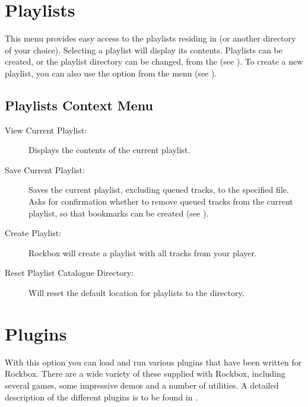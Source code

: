 
\section{\label{ref:playlistoptions}Playlists}
  This menu provides easy access to the playlists residing in  (or another
  directory of your choice). Selecting a playlist will display its contents.
  Playlists can be created, or the playlist directory can be changed, from the
   (see ).
  To create a new playlist, you can also use the  option from the
   menu (see ).

\subsection{\label{ref:playlistcatalogue_contextmenu}Playlists Context Menu}

\begin{description}
\item[View Current Playlist:]
  Displays the contents of the current playlist.

\item[Save Current Playlist:]
  Saves the current playlist, excluding queued tracks, to the
specified file. Asks for confirmation whether to remove queued tracks
from the current playlist, so that bookmarks can be created
(see ).

\item[Create Playlist:]
  Rockbox will create a playlist with all tracks from your player.

\item[Reset Playlist Catalogue Directory:]
  Will reset the default location for playlists to the 
directory.

\end{description}

\section{Plugins}
  With this option you can load and run various plugins that have been
written for Rockbox. There are a wide variety of these supplied with
Rockbox, including several games, some impressive demos and a number of
utilities. A detailed description of the different plugins is to be found in
.

